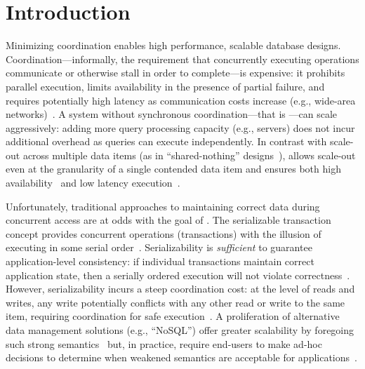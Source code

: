 
\section{Introduction}
\label{sec:intro}


Minimizing coordination enables high performance, scalable database
designs. Coordination---informally, the requirement that concurrently
executing operations communicate or otherwise stall in order to
complete---is expensive: it prohibits parallel execution, limits
availability in the presence of partial failure, and requires
potentially high latency as communication costs increase (e.g.,
wide-area networks)~\cite{hat-vldb,gilbert-cap}. A system without
synchronous coordination---that is \textit{\cfree}---can scale
aggressively: adding more query processing capacity (e.g., servers)
does not incur additional overhead as queries can execute
independently. In contrast with scale-out across multiple data items
(as in ``shared-nothing''
designs~\cite{bernstein-book,f1,spanner,pnuts,hstore}), \cfreedom
allows scale-out even at the granularity of a single contended data
item and ensures both high availability~\cite{gilbert-cap} and low
latency execution~\cite{pacelc}.


Unfortunately, traditional approaches to maintaining correct data
during concurrent access are at odds with the goal of \cfreedom. The
serializable transaction concept provides concurrent operations
(transactions) with the illusion of executing in some serial
order~\cite{bernstein-book}. Serializability is \textit{sufficient} to
guarantee application-level consistency: if individual transactions
maintain correct application state, then a serially ordered execution
will not violate correctness~\cite{gray-virtues}. However,
serializability incurs a steep coordination cost: at the level of
reads and writes, any write potentially conflicts with any other read
or write to the same item, requiring coordination for safe
execution~\cite{hat-vldb,davidson-survey}. A proliferation of
alternative data management solutions (e.g., ``NoSQL'') offer greater
scalability by foregoing such strong
semantics~\cite{dynamo,optimistic} but, in practice, require end-users
to make ad-hoc decisions to determine when weakened semantics are
acceptable for applications~\cite{consistency-borders}.


